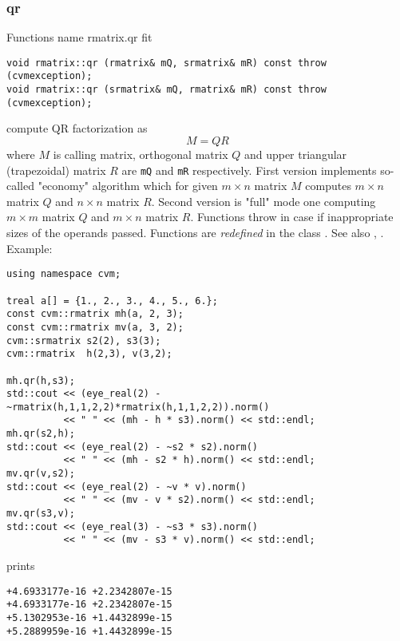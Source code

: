 \newpage



\subsubsection{qr}
Functions%
\pdfdest name {rmatrix.qr} fit
\begin{verbatim}
void rmatrix::qr (rmatrix& mQ, srmatrix& mR) const throw (cvmexception);
void rmatrix::qr (srmatrix& mQ, rmatrix& mR) const throw (cvmexception);
\end{verbatim}
compute QR factorization as
\begin{equation*}
M=QR
\end{equation*}
where 
$M$ is  calling matrix, orthogonal matrix $Q$ 
and upper triangular (trapezoidal) matrix $R$ are \verb"mQ" and \verb"mR"
respectively. First version implements so-called "economy" algorithm
which for  given $m\times n$ matrix $M$ computes $m\times n$ matrix $Q$
and $n\times n$ matrix $R$. Second version is  "full" mode one
computing $m\times m$ matrix $Q$ and $m\times n$ matrix $R$.
Functions throw
in case if inappropriate sizes of the operands passed.
Functions are \emph{redefined} in the class
.
See also ,
.
Example:
\begin{Verbatim}
using namespace cvm;

treal a[] = {1., 2., 3., 4., 5., 6.};
const cvm::rmatrix mh(a, 2, 3);
const cvm::rmatrix mv(a, 3, 2);
cvm::srmatrix s2(2), s3(3);
cvm::rmatrix  h(2,3), v(3,2);

mh.qr(h,s3);
std::cout << (eye_real(2) - ~rmatrix(h,1,1,2,2)*rmatrix(h,1,1,2,2)).norm()
          << " " << (mh - h * s3).norm() << std::endl;
mh.qr(s2,h);
std::cout << (eye_real(2) - ~s2 * s2).norm()
          << " " << (mh - s2 * h).norm() << std::endl;
mv.qr(v,s2);
std::cout << (eye_real(2) - ~v * v).norm()
          << " " << (mv - v * s2).norm() << std::endl;
mv.qr(s3,v);
std::cout << (eye_real(3) - ~s3 * s3).norm()
          << " " << (mv - s3 * v).norm() << std::endl;
\end{Verbatim}
prints
\begin{Verbatim}
+4.6933177e-16 +2.2342807e-15
+4.6933177e-16 +2.2342807e-15
+5.1302953e-16 +1.4432899e-15
+5.2889959e-16 +1.4432899e-15
\end{Verbatim}
\newpage




